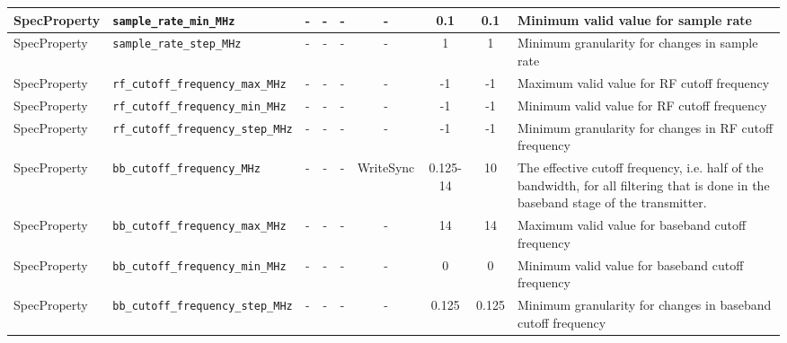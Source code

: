 \documentclass{article}
\begin{document}
\begin{landscape}
\begin{scriptsize}
\begin{tabular}{|p{2cm}|p{4cm}|c|c|c|c|c|c|p{6.5cm}|}
			\hline
			SpecProperty & \verb+sample_rate_min_MHz+          & -    & -        & -          & -              & 0.1          & 0.1     & Minimum valid value for sample rate                                                           \\
			\hline
			SpecProperty & \verb+sample_rate_step_MHz+         & -    & -        & -          & -              & 1            & 1       & Minimum granularity for changes in sample rate                                                \\
			\hline
			SpecProperty & \verb+rf_cutoff_frequency_max_MHz+  & -    & -        & -          & -              & -1           & -1      & Maximum valid value for RF cutoff frequency                                                   \\
			\hline
			SpecProperty & \verb+rf_cutoff_frequency_min_MHz+  & -    & -        & -          & -              & -1           & -1      & Minimum valid value for RF cutoff frequency                                                   \\
			\hline
			SpecProperty & \verb+rf_cutoff_frequency_step_MHz+ & -    & -        & -          & -              & -1           & -1      & Minimum granularity for changes in RF cutoff frequency                                        \\
			\hline
			SpecProperty & \verb+bb_cutoff_frequency_MHz+      & -    & -        & -          & WriteSync      & 0.125-14     & 10      & The effective cutoff frequency, i.e. half of the bandwidth, for all filtering that is done in the baseband stage of the transmitter. \\
			\hline
			SpecProperty & \verb+bb_cutoff_frequency_max_MHz+  & -    & -        & -          & -              & 14           & 14      & Maximum valid value for baseband cutoff frequency                                             \\
			\hline
			SpecProperty & \verb+bb_cutoff_frequency_min_MHz+  & -    & -        & -          & -              & 0            & 0       & Minimum valid value for baseband cutoff frequency                                             \\
			\hline
			SpecProperty & \verb+bb_cutoff_frequency_step_MHz+ & -    & -        & -          & -              & 0.125        & 0.125   & Minimum granularity for changes in baseband cutoff frequency                                  \\
			\hline
		\end{tabular}
	\end{scriptsize}
\end{landscape}
\end{document}
